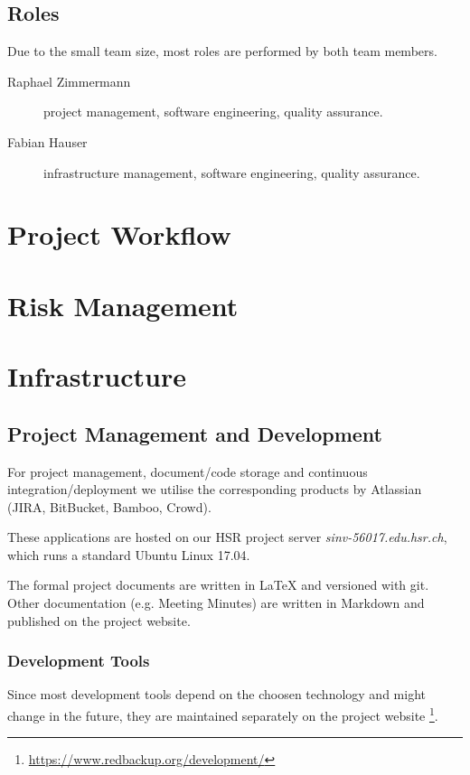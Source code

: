 \documentclass[a4paper]{article}
\begin{document}
\subsection{Roles}

Due to the small team size, most roles are performed by both team members.

\begin{description}
	\item[Raphael Zimmermann] project management, software engineering, quality assurance.
	\item[Fabian Hauser] infrastructure management, software engineering, quality assurance.
\end{description}

\section{Project Workflow}


\section{Risk Management}

\section{Infrastructure}


\subsection{Project Management and Development}

For project management, document/code storage and continuous integration/deployment we utilise the corresponding products by Atlassian (JIRA, BitBucket, Bamboo, Crowd)\cite{atlassian-opensource}.

These applications are hosted on our HSR project server \textit{sinv-56017.edu.hsr.ch}, which runs a standard Ubuntu Linux 17.04.

The formal project documents are written in LaTeX and versioned with git. Other documentation (e.g. Meeting Minutes) are written in Markdown and published on the project website.

\subsubsection{Development Tools}

Since most development tools depend on the choosen technology and might change in the future, they are maintained separately on the project website \footnote{\url{https://www.redbackup.org/development/}}.
\end{document}
